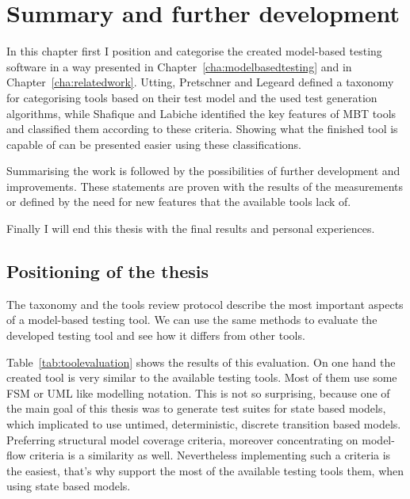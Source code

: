 \chapter{Summary and further development}
\label{cha:summary}

In this chapter first I position and categorise the created model-based testing software in a way presented in Chapter~\ref{cha:modelbasedtesting} and in Chapter~\ref{cha:relatedwork}. Utting, Pretschner and Legeard \cite{taxonomy} defined a taxonomy for categorising tools based on their test model and the used test generation algorithms, while Shafique and Labiche \cite{toolsreview} identified the key features of MBT tools and classified them according to these criteria. Showing what the finished tool is capable of can be presented easier using these classifications.

Summarising the work is followed by the possibilities of further development and improvements. These statements are proven with the results of the measurements or defined by the need for new features that the available tools lack of.

Finally I will end this thesis with the final results and personal experiences.

\section{Positioning of the thesis}
\label{sec:positioning}

The taxonomy and the tools review protocol describe the most important aspects of a model-based testing tool. We can use the same methods to evaluate the developed testing tool and see how it differs from other tools.

Table~\ref{tab:toolevaluation} shows the results of this evaluation. On one hand the created tool is very similar to the available testing tools. Most of them use some FSM or UML like modelling notation. This is not so surprising, because one of the main goal of this thesis was to generate test suites for state based models, which implicated to use untimed, deterministic, discrete transition based models. Preferring structural model coverage criteria, moreover concentrating on model-flow criteria is a similarity as well. Nevertheless implementing such a criteria is the easiest, that's why support the most of the available testing tools them, when using state based models.

